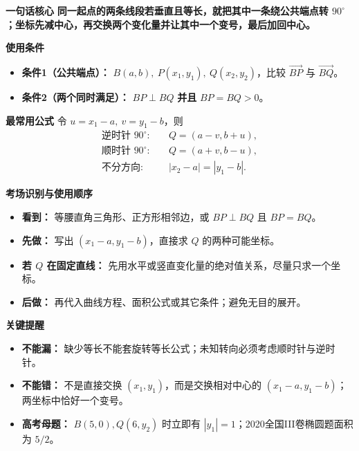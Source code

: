 \newpage
\begin{summarybox}
    \textbf{\textcolor{CSummary}{一句话核心}}
    \textbf{同一起点的两条线段若垂直且等长，就把其中一条绕公共端点转 $90^\circ$；坐标先减中心，再交换两个变化量并让其中一个变号，最后加回中心。}

    \medskip
    \textbf{\textcolor{CSummary}{使用条件}}
    \begin{itemize}[leftmargin=*,itemsep=0.5em,topsep=0.4em]
      \item \textbf{条件1（公共端点）：} $B(a,b),\ P(x_1,y_1),\ Q(x_2,y_2)$，比较 $\overrightarrow{BP}$ 与 $\overrightarrow{BQ}$。
      \item \textbf{条件2（两个同时满足）：} $BP\perp BQ$ \textbf{并且} $BP=BQ>0$。
    \end{itemize}

    \medskip
    \textbf{\textcolor{CSummary}{最常用公式}}
    令 $u=x_1-a,\ v=y_1-b$，则
    \[
      \boxed{\begin{aligned}
        \text{逆时针 }90^\circ:&\quad Q=(a-v,b+u),\\
        \text{顺时针 }90^\circ:&\quad Q=(a+v,b-u),\\
        \text{不分方向}:&\quad |x_2-a|=|y_1-b|.
      \end{aligned}}
    \]

    \medskip
    \textbf{\textcolor{CSummary}{考场识别与使用顺序}}
    \begin{itemize}[leftmargin=*,itemsep=0.5em,topsep=0.4em]
      \item \textbf{看到：} 等腰直角三角形、正方形相邻边，或 $BP\perp BQ$ 且 $BP=BQ$。
      \item \textbf{先做：} 写出 $(x_1-a,y_1-b)$，直接求 $Q$ 的两种可能坐标。
      \item \textbf{若 $Q$ 在固定直线：} 先用水平或竖直变化量的绝对值关系，尽量只求一个坐标。
      \item \textbf{后做：} 再代入曲线方程、面积公式或其它条件；避免无目的展开。
    \end{itemize}

    \medskip
    \textbf{\textcolor{CSummary}{关键提醒}}
    \begin{itemize}[leftmargin=*,itemsep=0.5em,topsep=0.4em]
      \item \textbf{不能漏：} 缺少等长不能套旋转等长公式；未知转向必须考虑顺时针与逆时针。
      \item \textbf{不能错：} 不是直接交换 $(x_1,y_1)$，而是交换相对中心的 $(x_1-a,y_1-b)$；两坐标中恰好一个变号。
      \item \textbf{高考母题：} $B(5,0),Q(6,y_2)$ 时立即有 $|y_1|=1$；2020全国III卷椭圆题面积为 $5/2$。
    \end{itemize}
\end{summarybox}
